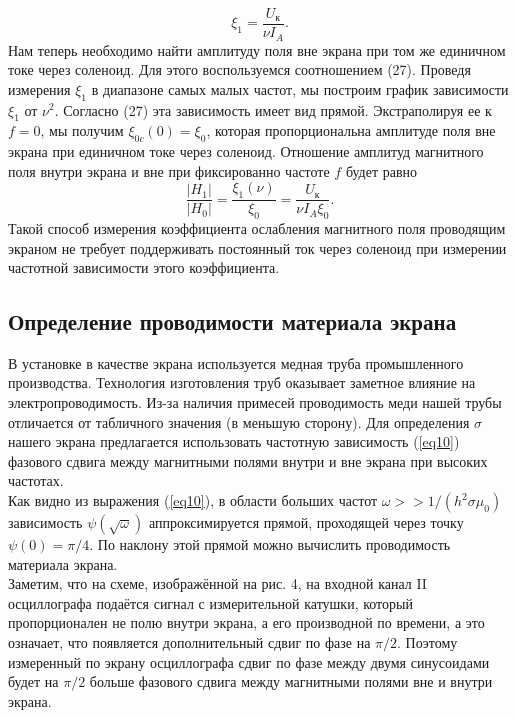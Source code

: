 \documentclass[a4paper,12pt]{article}
\theoremstyle{plain} %
\theoremstyle{definition} %
\theoremstyle{remark} %
\begin{document}
	\begin{equation}
		\xi_{1} = \dfrac{U_{\text{к}}}{\nu I_A}.
	\end{equation}
	Нам теперь необходимо найти амплитуду поля вне экрана при том же единичном токе через соленоид. Для этого воспользуемся соотношением (27). Проведя измерения $\xi_{1}$ в диапазоне самых малых частот, мы построим график зависимости $\xi_{1}$ от $\nu^2$. Согласно (27) эта зависимость имеет вид прямой. Экстраполируя ее к $f=0$, мы получим $\xi_{0c}(0) = \xi_0$, которая пропорциональна амплитуде поля вне экрана при единичном токе через соленоид. Отношение амплитуд магнитного поля внутри экрана и вне при фиксированно частоте $f$ будет равно 
	\begin{equation}\label{last}
		\dfrac{|H_{1}|}{|H_0|} = \dfrac{\xi_{1}(\nu)}{\xi_0} = \dfrac{U_{\text{к}}}{\nu I_A\xi_0}.
	\end{equation}
	Такой способ измерения коэффициента ослабления магнитного поля проводящим экраном не требует поддерживать постоянный ток через соленоид при измерении частотной зависимости этого коэффициента.
	
	\subsection{Определение проводимости материала экрана}
	
	\indent В установке в качестве экрана используется медная труба промышленного производства. Технология изготовления труб оказывает заметное влияние на электропроводимость. Из-за наличия примесей проводимость меди нашей трубы отличается от табличного значения (в меньшую сторону). Для определения $\sigma$ нашего экрана предлагается использовать частотную зависимость (\ref{eq10}) фазового сдвига между магнитными полями внутри и вне экрана при высоких частотах. \\
	\indent Как видно из выражения (\ref{eq10}), в области больших частот $\omega >> 1/(h^2 \sigma \mu_0)$ зависимость $\psi (\sqrt{\omega})$ аппроксимируется прямой, проходящей через точку $\psi (0) = \pi/4$. По наклону этой прямой можно вычислить проводимость материала экрана.\\
	\indent Заметим, что на схеме, изображённой на рис. 4, на входной канал II осциллографа подаётся сигнал с измерительной катушки, который пропорционален не полю внутри экрана, а его производной по времени, а это означает, что появляется дополнительный сдвиг по фазе на $\pi/2$. Поэтому измеренный по экрану осциллографа сдвиг по фазе между двумя синусоидами будет на $\pi/2$ больше фазового сдвига между магнитными полями вне и внутри экрана.
	
\end{document}
